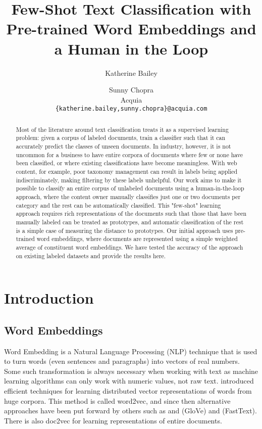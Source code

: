 \documentclass[11pt,letterpaper]{article}
\title{Few-Shot Text Classification with Pre-trained Word Embeddings and a Human in the Loop}
\author{Katherine Bailey\and Sunny Chopra \\
  Acquia \\
  \texttt{\{katherine.bailey,sunny.chopra\}@acquia.com}
}
\date{}
\begin{document}
\maketitle

\begin{abstract}
Most of the literature around text classification treats it as a supervised learning problem: given a corpus of labeled documents, train a classifier such that it can accurately predict the classes of unseen documents. In industry, however, it is not uncommon for a business to have entire corpora of documents where few or none have been classified, or where existing classifications have become meaningless. With web content, for example, poor taxonomy management can result in labels being applied indiscriminately, making filtering by these labels unhelpful. Our work aims to make it possible to classify an entire corpus of unlabeled documents using a human-in-the-loop approach, where the content owner manually classifies just one or two documents per category and the rest can be automatically classified. This "few-shot" learning approach requires rich representations of the documents such that those that have been manually labeled can be treated as prototypes, and automatic classification of the rest is a simple case of measuring the distance to prototypes. Our initial approach uses pre-trained word embeddings, where documents are represented using a simple weighted average of constituent word embeddings. We have tested the accuracy of the approach on existing labeled datasets and provide the results here.
\end{abstract}

\section{Introduction}

\subsection*{Word Embeddings}

Word Embedding is a Natural Language Processing (NLP) technique that is used to turn words (even sentences and paragraphs) into vectors of real numbers. Some such transformation is always necessary when working with text as machine learning algorithms can only work with numeric values, not raw text.  introduced efficient techniques for learning distributed vector representations of words from huge corpora. This method is called word2vec, and since then alternative approaches have been put forward by others such as and  (GloVe) and  (FastText). There is also doc2vec for learning representations of entire documents.
\end{document}

